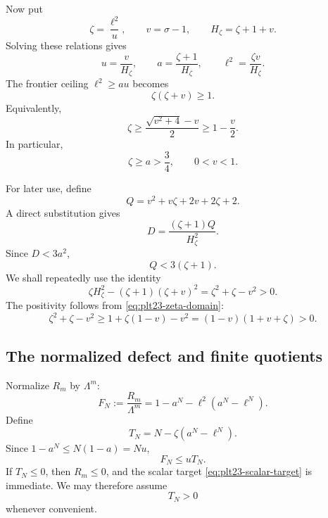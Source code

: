 \documentclass[11pt]{article}
\numberwithin{equation}{section}
\begin{document}
Now put
\begin{equation}\label{eq:plt23-zeta-v-def}
  \zeta=\frac{\ell^2}{u},
  \qquad v=\sigma-1,
  \qquad H_\zeta=\zeta+1+v.
\end{equation}
Solving these relations gives
\begin{equation}\label{eq:plt23-zeta-v-inverse}
  u=\frac {v}{H_\zeta},
  \qquad
  a=\frac{\zeta+1}{H_\zeta},
  \qquad
  \ell^2=\frac{\zeta v}{H_\zeta}.
\end{equation}
The frontier ceiling $\ell^2\ge au$ becomes
\begin{equation}\label{eq:plt23-zeta-domain}
  \zeta(\zeta+v)\ge1.
\end{equation}
Equivalently,
\begin{equation}\label{eq:plt23-zeta-simple-lower}
  \zeta\ge\frac{\sqrt{v^2+4}-v}{2}\ge1-\frac {v}{2}.
\end{equation}
In particular,
\begin{equation}\label{eq:plt23-zeta-lower}
  \zeta\ge a>\frac{3}{4},
  \qquad 0<v<1.
\end{equation}

For later use, define
\begin{equation}\label{eq:plt23-Q-chart}
  Q=v^2+v\zeta+2v+2\zeta+2.
\end{equation}
A direct substitution gives
\begin{equation}\label{eq:plt23-D-Q}
  D=\frac{(\zeta+1)Q}{H_\zeta^2}.
\end{equation}
Since $D<3a^2$,
\begin{equation}\label{eq:plt23-Q-upper}
  Q<3(\zeta+1).
\end{equation}
We shall repeatedly use the identity
\begin{equation}\label{eq:plt23-H-identity}
  \zeta H_\zeta^2-(\zeta+1)(\zeta+v)^2
  =\zeta^2+\zeta-v^2>0.
\end{equation}
The positivity follows from \eqref{eq:plt23-zeta-domain}:
\[
  \zeta^2+\zeta-v^2
  \ge1+\zeta(1-v)-v^2
  =(1-v)(1+v+\zeta)>0.
\]

\subsection{The normalized defect and finite quotients}

Normalize $R_m$ by $\Lambda^m$:
\begin{equation}\label{eq:plt23-F-def}
  F_N:=\frac{R_m}{\Lambda^m}
  =1-a^N-\ell^2(a^N-\ell^N).
\end{equation}
Define
\begin{equation}\label{eq:plt23-T-def}
  T_N=N-\zeta(a^N-\ell^N).
\end{equation}
Since $1-a^N\le N(1-a)=Nu$,
\begin{equation}\label{eq:plt23-F-T}
  F_N\le uT_N.
\end{equation}
If $T_N\le0$, then $R_m\le0$, and the scalar target
\eqref{eq:plt23-scalar-target} is immediate.  We may therefore assume
\begin{equation}\label{eq:plt23-T-positive}
  T_N>0
\end{equation}
whenever convenient.
\end{document}
